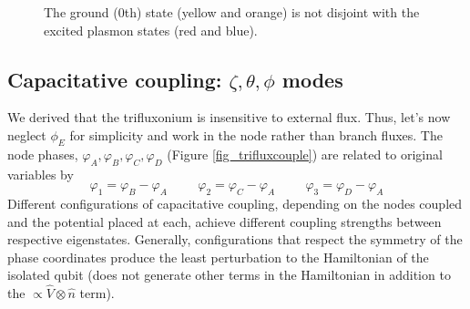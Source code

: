 \documentclass[11pt]{article}
\begin{document}
\begin{figure}[H]
	\centering
	\hspace{1em}
	\hspace{1em}
	\caption{The ground (0th) state (yellow and orange) is not disjoint with the excited plasmon states  (red and blue).}
	\label{fig_plasmons}
\end{figure}




\subsection{Capacitative coupling: $\zeta, \theta, \phi$ modes}

We derived that the trifluxonium is insensitive to external flux. Thus, let's now neglect $\phi_E$ for simplicity and work in the node rather than branch fluxes. The node phases, $\varphi_A, \varphi_B, \varphi_C, \varphi_D$ (Figure \ref{fig_trifluxcouple}) are related to original variables by
\begin{equation}
\varphi_1 = \varphi_B - \varphi_A
\hspace{1cm}
\varphi_2 = \varphi_C - \varphi_A
\hspace{1cm}
\varphi_3 = \varphi_D - \varphi_A 
\end{equation}
Different configurations of capacitative coupling, depending on the nodes coupled and the potential placed at each, achieve different coupling strengths between respective eigenstates. Generally, configurations that respect the symmetry of the phase coordinates produce the least perturbation to the Hamiltonian of the isolated qubit (does not generate other terms in the Hamiltonian in addition to the $\propto \hat{V} \otimes \hat{n}$ term). 
\end{document}
